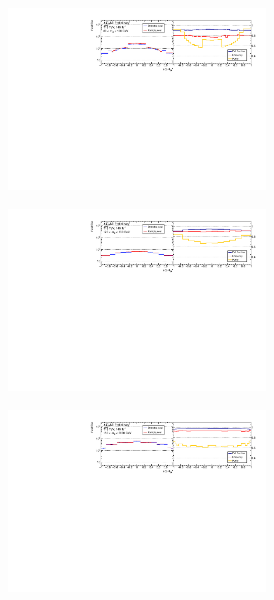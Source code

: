 \begin{figure}[htb]
    \centering 
    \begin{subfigure}{.99\textwidth}\centering
        \includegraphics[width = 0.75\textwidth]{Figures/m4l/UnfoldingStudies/v014_inputs/cosThetaStar3_m4l60-100inputs.pdf}
    \end{subfigure}
    \begin{subfigure}{.99\textwidth}\centering
        \includegraphics[width = 0.75\textwidth]{Figures/m4l/UnfoldingStudies/v014_inputs/cosThetaStar3_m4l120-130inputs.pdf}
    \end{subfigure}
    \begin{subfigure}{.99\textwidth}\centering
        \includegraphics[width = 0.75\textwidth]{Figures/m4l/UnfoldingStudies/v014_inputs/cosThetaStar3_m4l180-2000inputs.pdf}

\end{subfigure}
\end{figure}
